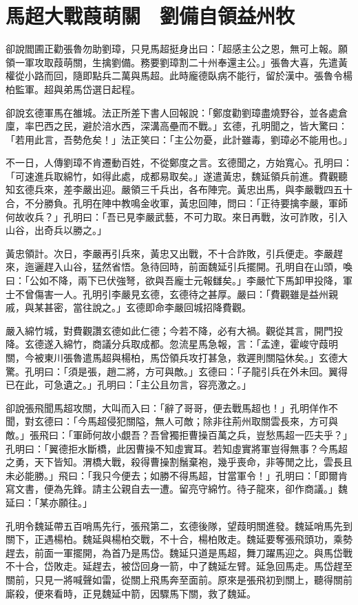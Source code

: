 
\chapter{馬超大戰葭萌關　劉備自領益州牧}

卻說閻圃正勸張魯勿助劉璋，只見馬超挺身出曰：「超感主公之恩，無可上報。願領一軍攻取葭萌關，生擒劉備。務要劉璋割二十州奉還主公。」張魯大喜，先遣黃權從小路而回，隨即點兵二萬與馬超。此時龐德臥病不能行，留於漢中。張魯令楊柏監軍。超與弟馬岱選日起程。

卻說玄德軍馬在雒城。法正所差下書人回報說：「鄭度勸劉璋盡燒野谷，並各處倉廩，率巴西之民，避於涪水西，深溝高壘而不戰。」玄德，孔明聞之，皆大驚曰：「若用此言，吾勢危矣！」法正笑曰：「主公勿憂，此計雖毒，劉璋必不能用也。」

不一日，人傳劉璋不肯遷動百姓，不從鄭度之言。玄德聞之，方始寬心。孔明曰：「可速進兵取綿竹，如得此處，成都易取矣。」遂遣黃忠，魏延領兵前進。費觀聽知玄德兵來，差李嚴出迎。嚴領三千兵出，各布陣完。黃忠出馬，與李嚴戰四五十合，不分勝負。孔明在陣中教鳴金收軍，黃忠回陣，問曰：「正待要擒李嚴，軍師何故收兵？」孔明曰：「吾已見李嚴武藝，不可力取。來日再戰，汝可詐敗，引入山谷，出奇兵以勝之。」

黃忠領計。次日，李嚴再引兵來，黃忠又出戰，不十合詐敗，引兵便走。李嚴趕來，迤邐趕入山谷，猛然省悟。急待回時，前面魏延引兵擺開。孔明自在山頭，喚曰：「公如不降，兩下已伏強弩，欲與吾龐士元報讎矣。」李嚴忙下馬卸甲投降，軍士不曾傷害一人。孔明引李嚴見玄德，玄德待之甚厚。嚴曰：「費觀雖是益州親戚，與某甚密，當往說之。」玄德即命李嚴回城招降費觀。

嚴入綿竹城，對費觀讚玄德如此仁德；今若不降，必有大禍。觀從其言，開門投降。玄德遂入綿竹，商議分兵取成都。忽流星馬急報，言：「孟達，霍峻守葭明關，今被東川張魯遣馬超與楊柏，馬岱領兵攻打甚急，救遲則關隘休矣。」玄德大驚。孔明曰：「須是張，趙二將，方可與敵。」玄德曰：「子龍引兵在外未回。翼得已在此，可急遺之。」孔明曰：「主公且勿言，容亮激之。」

卻說張飛聞馬超攻關，大叫而入曰：「辭了哥哥，便去戰馬超也！」孔明佯作不聞，對玄德曰：「今馬超侵犯關隘，無人可敵；除非往荊州取關雲長來，方可與敵。」張飛曰：「軍師何故小覷吾？吾曾獨拒曹操百萬之兵，豈愁馬超一匹夫乎？」孔明曰：「翼德拒水斷橋，此因曹操不知虛實耳。若知虛實將軍豈得無事？今馬超之勇，天下皆知。渭橋大戰，殺得曹操割鬚棄袍，幾乎喪命，非等閒之比，雲長且未必能勝。」飛曰：「我只今便去；如勝不得馬超，甘當軍令！」孔明曰：「即爾肯寫文書，便為先鋒。請主公親自去一遭。留亮守綿竹。待子龍來，卻作商議。」魏延曰：「某亦願往。」

孔明令魏延帶五百哨馬先行，張飛第二，玄德後隊，望葭明關進發。魏延哨馬先到關下，正遇楊柏。魏延與楊柏交戰，不十合，楊柏敗走。魏延要奪張飛頭功，乘勢趕去，前面一軍擺開，為首乃是馬岱。魏延只道是馬超，舞刀躍馬迎之。與馬岱戰不十合，岱敗走。延趕去，被岱回身一箭，中了魏延左臂。延急回馬走。馬岱趕至關前，只見一將喊聲如雷，從關上飛馬奔至面前。原來是張飛初到關上，聽得關前廝殺，便來看時，正見魏延中箭，因驟馬下關，救了魏延。

